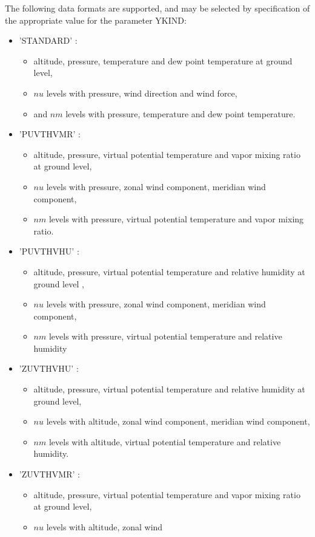 The following  data formats are supported, and may be selected by specification
of the appropriate value for the parameter YKIND:
\begin{itemize}
\item 'STANDARD'  :
\begin{itemize} \item altitude, pressure, temperature and dew point temperature at
ground level,
\item $nu$ levels with pressure, wind direction and wind force,
\item and $nm$
levels with pressure, temperature and dew point temperature.
\end{itemize}
\item 'PUVTHVMR'  : \begin{itemize} \item altitude, pressure, virtual potential temperature
and vapor mixing ratio at ground level,\item   $nu$ levels with pressure, zonal wind
component, meridian wind component,\item  $nm$ levels with pressure, virtual potential temperature
and vapor mixing ratio.\end{itemize}
\item 'PUVTHVHU' : \begin{itemize} \item altitude, pressure, virtual potential temperature
and relative humidity at ground level , \item $nu$ levels with pressure, zonal wind
component, meridian wind component,\item  $nm$ levels with pressure, virtual potential temperature
and relative humidity \end{itemize}
\item 'ZUVTHVHU'  : \begin{itemize} \item altitude, pressure, virtual potential temperature
and relative humidity at ground level,\item    $nu$ levels with altitude, zonal wind
component, meridian wind component, \item  $nm$ levels with altitude, virtual potential temperature
and relative humidity.\end{itemize}
\item 'ZUVTHVMR'  :  \begin{itemize} \item  altitude, pressure, virtual potential temperature
and vapor mixing ratio at ground level, \item  $nu$ levels with altitude, zonal wind

\end{itemize}
\end{itemize}
